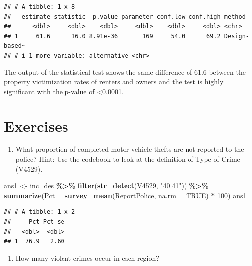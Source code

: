 \documentclass[
]{krantz}
\makeatletter
\newenvironment{Shaded}{\begin{snugshade}}{\end{snugshade}}
\newcommand{\AttributeTok}[1]{\textcolor[rgb]{0.27,0.27,0.27}{#1}}
\newcommand{\ConstantTok}[1]{\textcolor[rgb]{0.37,0.37,0.37}{#1}}
\newcommand{\DecValTok}[1]{\textcolor[rgb]{0.06,0.06,0.06}{#1}}
\newcommand{\FunctionTok}[1]{\textcolor[rgb]{0.27,0.27,0.27}{\textbf{#1}}}
\newcommand{\NormalTok}[1]{#1}
\newcommand{\OtherTok}[1]{\textcolor[rgb]{0.37,0.37,0.37}{#1}}
\newcommand{\SpecialCharTok}[1]{\textcolor[rgb]{0.43,0.43,0.43}{\textbf{#1}}}
\newcommand{\StringTok}[1]{\textcolor[rgb]{0.5,0.5,0.5}{#1}}
\providecommand{\tightlist}{%
  \setlength{\itemsep}{0pt}\setlength{\parskip}{0pt}}
\newenvironment{kframe}{%
\medskip{}
\setlength{\fboxsep}{.8em}
 \def\at@end@of@kframe{}%
 \ifinner\ifhmode%
  \def\at@end@of@kframe{\end{minipage}}%
  \begin{minipage}{\columnwidth}%
 \fi\fi%
 \def\FrameCommand##1{\hskip\@totalleftmargin \hskip-\fboxsep
 \colorbox{shadecolor}{##1}\hskip-\fboxsep
     \hskip-\linewidth \hskip-\@totalleftmargin \hskip\columnwidth}%
 \MakeFramed {\advance\hsize-\width
   \@totalleftmargin\z@ \linewidth\hsize
   \@setminipage}}%
 {\par\unskip\endMakeFramed%
 \at@end@of@kframe}
\renewenvironment{Shaded}{\begin{kframe}}{\end{kframe}}
\makeatother
\begin{document}
\begin{verbatim}
## # A tibble: 1 x 8
##   estimate statistic  p.value parameter conf.low conf.high method       
##      <dbl>     <dbl>    <dbl>     <dbl>    <dbl>     <dbl> <chr>        
## 1     61.6      16.0 8.91e-36       169     54.0      69.2 Design-based~
## # i 1 more variable: alternative <chr>
\end{verbatim}

The output of the statistical test shows the same difference of 61.6 between the property victimization rates of renters and owners and the test is highly significant with the p-value of \textless0.0001.

\hypertarget{exercises-3}{%
\section{Exercises}\label{exercises-3}}

\begin{enumerate}
\def\labelenumi{\arabic{enumi}.}
\tightlist
\item
  What proportion of completed motor vehicle thefts are not reported to the police? Hint: Use the codebook to look at the definition of Type of Crime (V4529).
\end{enumerate}

\begin{Shaded}
\begin{Highlighting}[]
\NormalTok{ans1 }\OtherTok{\textless{}{-}}\NormalTok{ inc\_des }\SpecialCharTok{\%\textgreater{}\%}
  \FunctionTok{filter}\NormalTok{(}\FunctionTok{str\_detect}\NormalTok{(V4529, }\StringTok{"40|41"}\NormalTok{)) }\SpecialCharTok{\%\textgreater{}\%}
  \FunctionTok{summarize}\NormalTok{(}\AttributeTok{Pct =} \FunctionTok{survey\_mean}\NormalTok{(ReportPolice, }\AttributeTok{na.rm =} \ConstantTok{TRUE}\NormalTok{) }\SpecialCharTok{*} \DecValTok{100}\NormalTok{)}
\NormalTok{ans1}
\end{Highlighting}
\end{Shaded}

\begin{verbatim}
## # A tibble: 1 x 2
##     Pct Pct_se
##   <dbl>  <dbl>
## 1  76.9   2.60
\end{verbatim}

\begin{enumerate}
\def\labelenumi{\arabic{enumi}.}
\setcounter{enumi}{1}
\tightlist
\item
  How many violent crimes occur in each region?
\end{enumerate}
\end{document}
